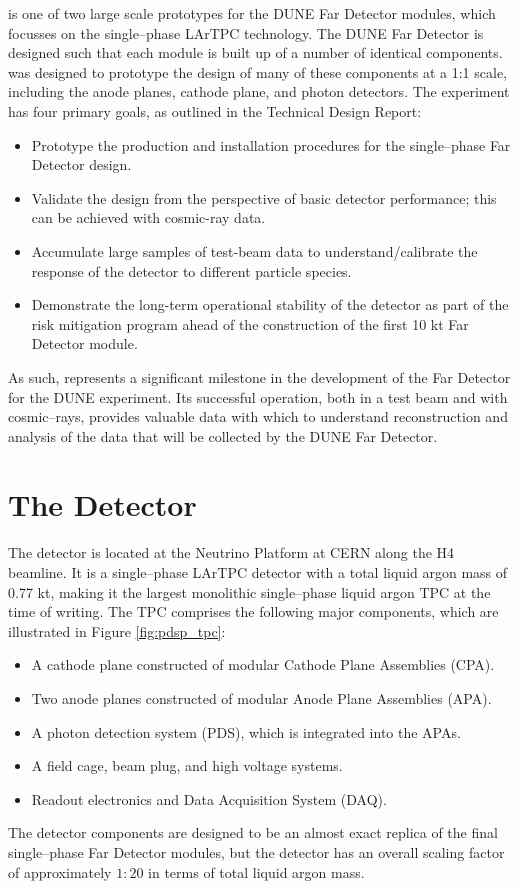 \bigskip\noindent
\protodune{} is one of two large scale prototypes for the DUNE Far Detector
modules, which focusses on the single--phase LArTPC technology. The DUNE Far
Detector is designed such that each module is built up of a number of 
identical components. \protodune{} was designed to prototype the design of 
many of these components at a 1:1 scale, including the anode planes, cathode 
plane, and photon detectors. The \protodune{} experiment has four primary 
goals, as outlined in the Technical Design Report\cite{Abi:2017aow}:
\begin{itemize}
	\item Prototype the production and installation procedures for the
		single--phase Far Detector design.
	\item Validate the design from the perspective of basic detector performance; this can be achieved with cosmic-ray data. 
	\item Accumulate large samples of test-beam data to understand/calibrate the
		response of the detector to different particle species.
	\item Demonstrate the long-term operational stability of the detector as part
		of the risk mitigation program ahead of the construction of the first 10 kt
		Far Detector module.
\end{itemize}
As such, \protodune{} represents a significant milestone in the development of
the Far Detector for the DUNE experiment. Its successful operation, both in a 
test beam and with cosmic--rays, provides valuable data with which to understand
reconstruction and analysis of the data that will be collected by the DUNE Far 
Detector.

\section{The \protodune{} Detector} \label{sec:pdsp_detector}

The \protodune{} detector is located at the Neutrino Platform at CERN along the
H4 beamline. It is a single--phase LArTPC detector with a total liquid argon 
mass of 0.77 kt, making it the largest monolithic single--phase liquid argon TPC
at the time of writing. The TPC comprises the following major components, which 
are illustrated in Figure \ref{fig:pdsp_tpc}:
\begin{itemize}
	\item A cathode plane constructed of modular Cathode Plane Assemblies (CPA).
	\item Two anode planes constructed of modular Anode Plane Assemblies (APA).
	\item A photon detection system (PDS), which is integrated into the APAs.
	\item A field cage, beam plug, and high voltage systems.
	\item Readout electronics and Data Acquisition System (DAQ).
\end{itemize}
The detector components are designed to be an almost exact replica of the final 
single--phase Far Detector modules, but the detector has an overall scaling 
factor of approximately $1:20$ in terms of total liquid argon 
mass\cite{Abi:2017aow}.

